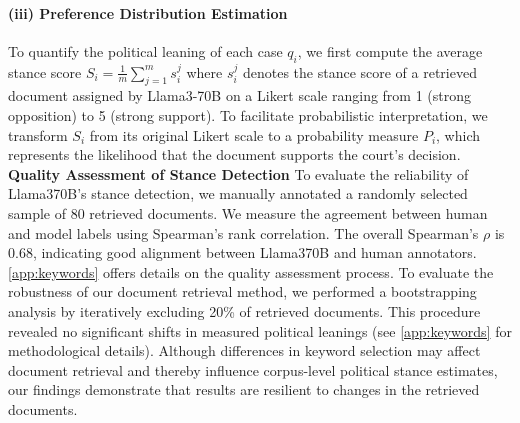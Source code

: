\paragraph{(iii) Preference Distribution Estimation}
To quantify the political leaning of each case \( q_{i} \), we first compute the average stance score 
$S_{i} = \frac{1}{m} \sum_{j=1}^{m} s_{i}^j$
where $s_{i}^j$ denotes the stance score of a retrieved document assigned by Llama3-70B on a Likert scale ranging from 1 (strong opposition) to 5 (strong support).
To facilitate probabilistic interpretation, we transform $S_{i}$ from its original Likert scale to a probability measure $P_{i}$, which represents the likelihood that the document supports the court’s decision.\\
\textbf{Quality Assessment of Stance Detection} To evaluate the reliability of Llama3\-70B’s stance detection, we manually annotated a randomly selected sample of 80 retrieved documents. We measure the agreement between human and model labels using Spearman's rank correlation\cite{spearman1904proof}. The overall Spearman's $\rho$ is 0.68, indicating good alignment between Llama3\-70B and human annotators. \autoref{app:keywords} offers details on the quality assessment process. To evaluate the robustness of our document retrieval method, we performed a bootstrapping analysis by iteratively excluding 20\% of retrieved documents. This procedure revealed no significant shifts in measured political leanings (see \autoref{app:keywords} for methodological details). Although differences in keyword selection may affect document retrieval and thereby influence corpus-level political stance estimates, our findings demonstrate that results are resilient to changes in the retrieved documents.

